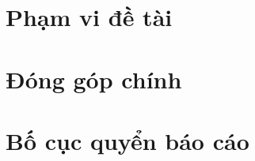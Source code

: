 \section{Phạm vi đề tài}
\label{sec:pham-vi}

\section{Đóng góp chính}
\label{sec:dong-gop}

\section{Bố cục quyển báo cáo}
\label{sec:bo-cuc}

